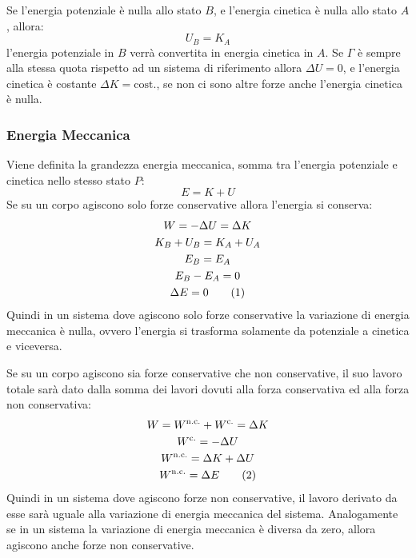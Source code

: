 \documentclass{article}
\numberwithin{equation}{subsection}
\begin{document}
Se l'energia potenziale è nulla allo stato $B$, e l'energia cinetica 
è nulla allo stato $A$, allora:
\begin{equation*}
    U_B=K_A
\end{equation*}
l'energia potenziale in $B$ verrà convertita in energia cinetica in $A$.
Se $\Gamma$ è sempre alla stessa 
quota rispetto ad un sistema di riferimento allora $\Delta U=0$, 
e l'energia cinetica è costante $\Delta K = \mathrm{cost.}$, se non ci sono 
altre forze anche l'energia cinetica è nulla.

\subsubsection{Energia Meccanica}
Viene definita la grandezza energia meccanica, somma tra 
l'energia potenziale e cinetica nello stesso stato $P$:
\begin{equation}
    E=K+U
\end{equation}
Se su un corpo agiscono solo forze conservative allora l'energia si conserva: 
\begin{gather*}
    W=-\Delta U = \Delta K\\    
    K_B+U_B=K_A+U_A\\
    E_B=E_A\\
    E_B-E_A=0\\
    \Delta E=0\tag{\stepcounter{equation}\theequation}
\end{gather*}
Quindi in un sistema dove agiscono solo forze conservative la 
variazione di energia meccanica è nulla, ovvero l'energia si 
trasforma solamente da potenziale a cinetica e viceversa. 




Se su un corpo agiscono sia forze conservative che non 
conservative, il suo lavoro totale sarà dato dalla somma dei 
lavori dovuti alla forza conservativa ed alla forza non 
conservativa: 
\begin{gather*}
    W=W^{\mathrm{n.c.}}+W^{\mathrm{c.}}=\Delta K\\
    W^{\mathrm{c.}}=-\Delta U\\
    W^{\mathrm{n.c.}}=\Delta K +\Delta U\\
    W^{\mathrm{n.c.}}=\Delta E\tag{\stepcounter{equation}\theequation}
\end{gather*}
Quindi in un sistema dove agiscono forze non conservative, il 
lavoro derivato da esse sarà uguale alla variazione di energia 
meccanica del sistema. Analogamente se in un sistema la 
variazione di energia meccanica è diversa da zero, allora 
agiscono anche forze non conservative.
\end{document}
